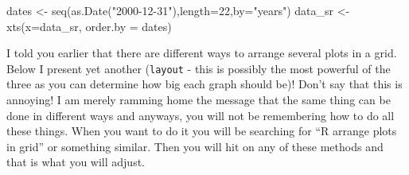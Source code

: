 \documentclass[
]{article}
\newenvironment{Shaded}{\begin{snugshade}}{\end{snugshade}}
\newcommand{\AttributeTok}[1]{\textcolor[rgb]{0.77,0.63,0.00}{#1}}
\newcommand{\ConstantTok}[1]{\textcolor[rgb]{0.00,0.00,0.00}{#1}}
\newcommand{\DecValTok}[1]{\textcolor[rgb]{0.00,0.00,0.81}{#1}}
\newcommand{\FunctionTok}[1]{\textcolor[rgb]{0.00,0.00,0.00}{#1}}
\newcommand{\NormalTok}[1]{#1}
\newcommand{\OtherTok}[1]{\textcolor[rgb]{0.56,0.35,0.01}{#1}}
\newcommand{\SpecialCharTok}[1]{\textcolor[rgb]{0.00,0.00,0.00}{#1}}
\newcommand{\StringTok}[1]{\textcolor[rgb]{0.31,0.60,0.02}{#1}}
\begin{document}
\begin{Shaded}
\begin{Highlighting}[]
\NormalTok{dates }\OtherTok{\textless{}{-}} \FunctionTok{seq}\NormalTok{(}\FunctionTok{as.Date}\NormalTok{(}\StringTok{"2000{-}12{-}31"}\NormalTok{),}\AttributeTok{length=}\DecValTok{22}\NormalTok{,}\AttributeTok{by=}\StringTok{"years"}\NormalTok{)}
\NormalTok{data\_sr }\OtherTok{\textless{}{-}} \FunctionTok{xts}\NormalTok{(}\AttributeTok{x=}\NormalTok{data\_sr, }\AttributeTok{order.by =}\NormalTok{ dates)}
\end{Highlighting}
\end{Shaded}

I told you earlier that there are different ways to arrange several
plots in a grid. Below I present yet another (\texttt{layout} - this is
possibly the most powerful of the three as you can determine how big
each graph should be)! Don't say that this is annoying! I am merely
ramming home the message that the same thing can be done in different
ways and anyways, you will not be remembering how to do all these
things. When you want to do it you will be searching for ``R arrange
plots in grid'' or something similar. Then you will hit on any of these
methods and that is what you will adjust.

\begin{Shaded}
\end{Shaded}
\end{document}
